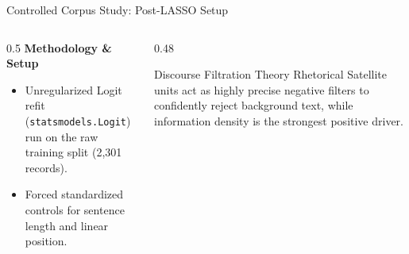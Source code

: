 \documentclass[aspectratio=169]{beamer}
\begin{document}
\begin{frame}{Controlled Corpus Study: Post-LASSO Setup}
    \begin{columns}
        \begin{column}{0.5\textwidth}
            \textbf{Methodology \& Setup}
            \begin{itemize}
                \item Unregularized Logit refit (\texttt{statsmodels.Logit}) run on the raw training split (2,301 records).
                \item Forced standardized controls for sentence length and linear position.
            \end{itemize}
        \end{column}
        
        \begin{column}{0.48\textwidth}
            \begin{alertblock}{Discourse Filtration Theory}
                Rhetorical Satellite units act as highly precise negative filters to confidently reject background text, while information density is the strongest positive driver.
            \end{alertblock}
        \end{column}
    \end{columns}
\end{frame}
\end{document}
